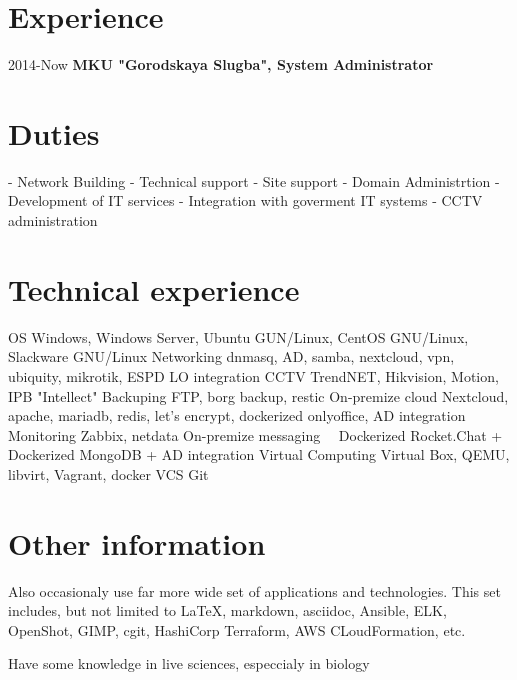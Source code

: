 \documentclass[]{twentysecondcv}
\begin{document}
\section{Experience}
\begin{twentyshort}
  \twentyitemshort
    {2014-Now}
    {\textbf{MKU "Gorodskaya Slugba", System Administrator}}
\end{twentyshort}

\section{Duties}
\begin{twentyshort}
  \twentyitemshort
    {-}
    {Network Building}
  \twentyitemshort
    {-}
    {Technical support}
   \twentyitemshort
    {-}
    {Site support}
    \twentyitemshort
    {-}
    {Domain Administrtion}
    \twentyitemshort
    {-}
    {Development of IT services}
    \twentyitemshort
    {-}
    {Integration with goverment IT systems}
    \twentyitemshort
    {-}
    {CCTV administration}
\end{twentyshort}


\section{Technical experience}
\begin{twentyshort}
  \twentyitemshort
    {OS}
    {Windows, Windows Server, Ubuntu GUN/Linux, CentOS GNU/Linux, Slackware GNU/Linux}
  \twentyitemshort
    {Networking}
    {dnmasq, AD, samba, nextcloud, vpn, ubiquity, mikrotik, ESPD LO integration}
  \twentyitemshort
    {CCTV}
    {TrendNET, Hikvision, Motion, IPB "Intellect"}
   \twentyitemshort
    {Backuping}
    {FTP, borg backup, restic}
    \twentyitemshort
    {On-premize cloud}
    {Nextcloud, apache, mariadb, redis,  let's encrypt, dockerized onlyoffice, AD integration}
    \twentyitemshort
    {Monitoring}
    {Zabbix, netdata}
    \twentyitemshort
    {On-premize messaging\ \ }
    {Dockerized Rocket.Chat + Dockerized MongoDB  + AD integration}
    \twentyitemshort
    {Virtual Computing}
    {Virtual Box, QEMU, libvirt, Vagrant, docker}
    \twentyitemshort
    {VCS}
    {Git}
\end{twentyshort}


\section{Other information}
Also occasionaly use far more wide set of applications and technologies. This set includes, but not limited to \LaTeX, markdown, asciidoc, Ansible, ELK, OpenShot, GIMP, cgit, HashiCorp Terraform, AWS CLoudFormation, etc.

Have some knowledge in live sciences, especcialy in biology

\end{document}
